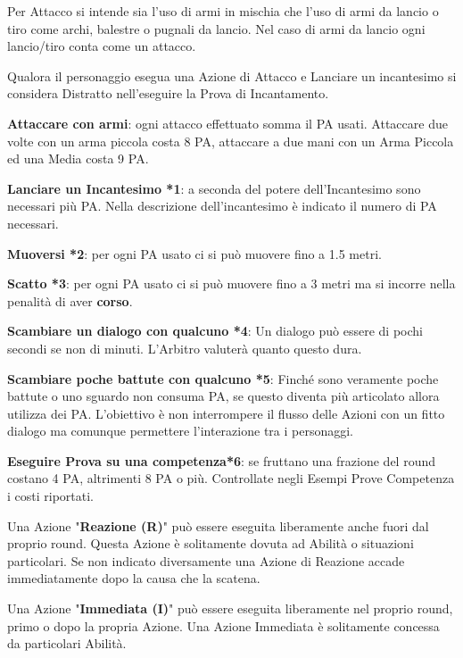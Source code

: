 \documentclass[12pt,a4paper,twoside,openany]{book}
\begin{document}
\medskip

Per Attacco si intende sia l'uso di armi in mischia che l'uso di armi da lancio o tiro come archi, balestre o pugnali da lancio. Nel caso di armi da lancio ogni lancio/tiro conta come un attacco.

Qualora il personaggio esegua una Azione di Attacco e Lanciare un incantesimo si considera Distratto nell'eseguire la Prova di Incantamento.

\begin{multicols}{2}
	
\textbf{Attaccare con armi}: ogni attacco effettuato somma il PA usati. Attaccare due volte con un arma piccola costa 8 PA, attaccare a due mani con un Arma Piccola ed una Media costa 9 PA.

\textbf{Lanciare un Incantesimo *1}: a seconda del potere dell'Incantesimo sono necessari più PA. Nella descrizione dell'incantesimo è indicato il numero di PA necessari. 

\textbf{Muoversi *2}: per ogni PA usato ci si può muovere fino a 1.5 metri.

\textbf{Scatto *3}: per ogni PA usato ci si può muovere fino a 3 metri ma si incorre nella penalità di aver \textbf{corso}.

\textbf{Scambiare un dialogo con qualcuno *4}: Un dialogo può essere di pochi secondi se non di minuti. L'Arbitro valuterà quanto questo dura.

\textbf{Scambiare poche battute con qualcuno *5}: Finché sono veramente poche battute o uno sguardo non consuma PA, se questo diventa più articolato allora utilizza dei PA. L'obiettivo è non interrompere il flusso delle Azioni con un fitto dialogo ma comunque permettere l'interazione tra i personaggi.

\textbf{Eseguire Prova su una competenza*6}: se fruttano una frazione del round costano 4 PA, altrimenti 8 PA o più. Controllate negli Esempi Prove Competenza i costi riportati.

Una Azione "\textbf{Reazione (R)}" può essere eseguita liberamente anche fuori dal proprio round. Questa Azione è solitamente dovuta ad Abilità o situazioni particolari. Se non indicato diversamente una Azione di Reazione accade immediatamente dopo la causa che la scatena.

Una Azione "\textbf{Immediata (I)}" può essere eseguita liberamente nel proprio round, primo o dopo la propria Azione. Una Azione Immediata è solitamente concessa da particolari Abilità.


\end{multicols}
\end{document}
